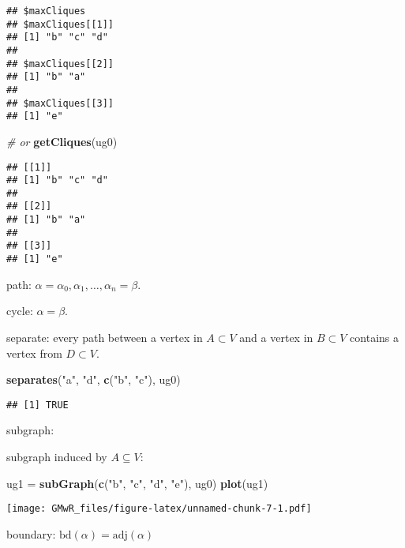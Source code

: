 \documentclass[]{article}
\newenvironment{Shaded}{\begin{snugshade}}{\end{snugshade}}
\newcommand{\KeywordTok}[1]{\textcolor[rgb]{0.13,0.29,0.53}{\textbf{#1}}}
\newcommand{\StringTok}[1]{\textcolor[rgb]{0.31,0.60,0.02}{#1}}
\newcommand{\CommentTok}[1]{\textcolor[rgb]{0.56,0.35,0.01}{\textit{#1}}}
\newcommand{\NormalTok}[1]{#1}
\begin{document}
\begin{verbatim}
## $maxCliques
## $maxCliques[[1]]
## [1] "b" "c" "d"
## 
## $maxCliques[[2]]
## [1] "b" "a"
## 
## $maxCliques[[3]]
## [1] "e"
\end{verbatim}

\begin{Shaded}
\begin{Highlighting}[]
\CommentTok{# or}
\KeywordTok{getCliques}\NormalTok{(ug0) }
\end{Highlighting}
\end{Shaded}

\begin{verbatim}
## [[1]]
## [1] "b" "c" "d"
## 
## [[2]]
## [1] "b" "a"
## 
## [[3]]
## [1] "e"
\end{verbatim}

path: \(\alpha = \alpha_0,\alpha_1,\ldots,\alpha_n=\beta\).

cycle: \(\alpha=\beta\).

separate: every path between a vertex in \(A\subset V\) and a vertex in
\(B\subset V\) contains a vertex from \(D\subset V\).

\begin{Shaded}
\begin{Highlighting}[]
\KeywordTok{separates}\NormalTok{(}\StringTok{"a"}\NormalTok{, }\StringTok{"d"}\NormalTok{, }\KeywordTok{c}\NormalTok{(}\StringTok{"b"}\NormalTok{, }\StringTok{"c"}\NormalTok{), ug0)}
\end{Highlighting}
\end{Shaded}

\begin{verbatim}
## [1] TRUE
\end{verbatim}

subgraph:

subgraph induced by \(A\subseteq V\):

\begin{Shaded}
\begin{Highlighting}[]
\NormalTok{ug1 =}\StringTok{ }\KeywordTok{subGraph}\NormalTok{(}\KeywordTok{c}\NormalTok{(}\StringTok{"b"}\NormalTok{, }\StringTok{"c"}\NormalTok{, }\StringTok{"d"}\NormalTok{, }\StringTok{"e"}\NormalTok{), ug0)}
\KeywordTok{plot}\NormalTok{(ug1)}
\end{Highlighting}
\end{Shaded}

\texttt{[image: GMwR\_files/figure-latex/unnamed-chunk-7-1.pdf]}

boundary: \(\mathrm{bd}(\alpha)=\mathrm{adj}(\alpha)\)
\end{document}
